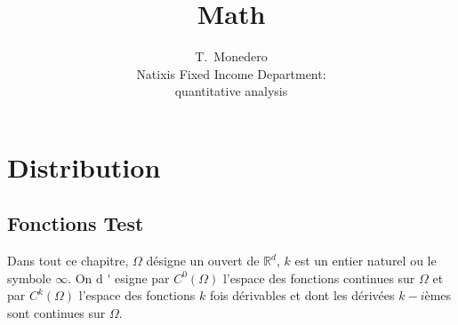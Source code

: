 \documentclass[3pt]{article}
\begin{document}
\title{Math}
\author{T.\ Monedero \\
Natixis Fixed Income Department:\\
quantitative analysis }
\maketitle

\begin{abstract}
\end{abstract}

\tableofcontents

\bigskip

\bigskip

\bigskip

\bigskip

\bigskip

\bigskip

\bigskip

\bigskip

\bigskip

\bigskip

\bigskip

\bigskip

\bigskip

\bigskip

\bigskip

\bigskip

\bigskip

\bigskip

\bigskip

\bigskip

\bigskip

\bigskip

\section{Distribution}

\bigskip

\subsection{Fonctions Test}

\bigskip

Dans tout ce chapitre, $\Omega $ d\'{e}signe un ouvert de $\mathbb{R}^{d}$, $%
k$ est un entier naturel ou le symbole $\infty $. On d%
\'{}%
esigne par $C^{0}(\Omega )$ l'espace des fonctions continues sur $\Omega $
et par $C^{k}(\Omega )$ l'espace des fonctions $k$ fois d\'{e}rivables et
dont les d\'{e}riv\'{e}es $k-i$\`{e}mes sont continues sur $\Omega $.
\end{document}
